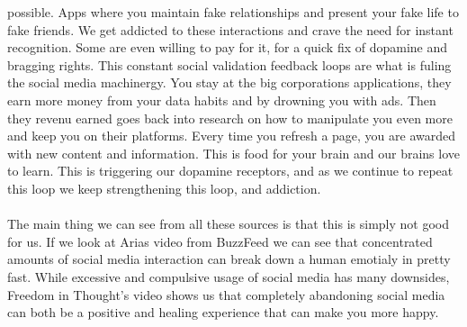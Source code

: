 \documentclass[11pt]{article}
\begin{document}
possible. Apps where you maintain fake relationships and present your fake life to fake
friends.  We get addicted to these interactions and crave the need for instant
recognition. Some are even willing to pay for it, for a quick fix of dopamine and
bragging rights. This constant social validation feedback loops are what is fuling the
social media machinergy. You stay at the big corporations applications, they earn more
money from your data habits and by drowning you with ads. Then they revenu earned goes
back into research on how to manipulate you even more and keep you on their platforms.
Every time you refresh a page, you are awarded with new content and information. This
is food for your brain and our brains love to learn. This is triggering our dopamine
receptors, and as we continue to repeat this loop we keep strengthening this loop, and
addiction.\\\\
The main thing we can see from all these sources is that this is simply not good for us.
If we look at Arias video from BuzzFeed we can see that concentrated amounts of social
media interaction can break down a human emotialy in pretty fast. While excessive and
compulsive usage of social media has many downsides, Freedom in Thought’s video shows
us that completely abandoning social media can both be a positive and healing experience
that can make you more happy.


\pagebreak


\end{document}
